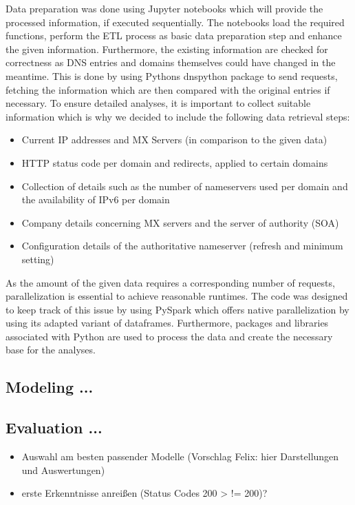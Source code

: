 Data preparation was done using Jupyter notebooks which will provide the processed information, if executed sequentially.
The notebooks load the required functions, perform the ETL process as basic data preparation step and enhance the given information.
Furthermore, the existing information are checked for correctness as DNS entries and domains themselves could have changed in the meantime.
This is done by using Pythons dnspython package to send requests, fetching the information which are then compared with the original entries if necessary.
To ensure detailed analyses, it is important to collect suitable information which is why we decided to include the following data retrieval steps:
\begin{itemize}
    \item Current IP addresses and MX Servers (in comparison to the given data)
    \item HTTP status code per domain and redirects, applied to certain domains
    \item Collection of details such as the number of nameservers used per domain and the availability of IPv6 per domain
    \item Company details concerning MX servers and the server of authority (SOA)
    \item Configuration details of the authoritative nameserver (refresh and minimum setting)
\end{itemize}
As the amount of the given data requires a corresponding number of requests, parallelization is essential to achieve reasonable runtimes.
The code was designed to keep track of this issue by using PySpark which offers native parallelization by using its adapted variant of dataframes.
Furthermore, packages and libraries associated with Python are used to process the data and create the necessary base for the analyses.

\subsection{Modeling ...}\label{subsec:modeling}
\subsection{Evaluation ...}\label{subsec:evaluation}
\begin{itemize}
    \item Auswahl am besten passender Modelle (Vorschlag Felix: hier Darstellungen und Auswertungen)
    \item erste Erkenntnisse anreißen (Status Codes 200 > != 200)?
\end{itemize}


